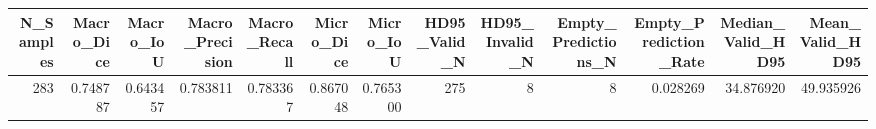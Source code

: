 \begin{tabular}{rrrrrrrrrrrrr}
\toprule
N_Samples & Macro_Dice & Macro_IoU & Macro_Precision & Macro_Recall & Micro_Dice & Micro_IoU & HD95_Valid_N & HD95_Invalid_N & Empty_Predictions_N & Empty_Prediction_Rate & Median_Valid_HD95 & Mean_Valid_HD95 \\
\midrule
283 & 0.748787 & 0.643457 & 0.783811 & 0.783367 & 0.867048 & 0.765300 & 275 & 8 & 8 & 0.028269 & 34.876920 & 49.935926 \\
\bottomrule
\end{tabular}
